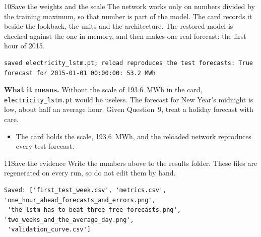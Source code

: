 
\begin{labquestion}{10}{Save the weights and the scale}
The network works only on numbers divided by the training maximum, so that number is part of the model. The card records it beside the lookback, the units and the architecture. The restored model is checked against the one in memory, and then makes one real forecast: the first hour of 2015.
\end{labquestion}
\begin{labanswer}

\begin{refoutput}
\begin{lstlisting}[style=utpterminal]
saved electricity_lstm.pt; reload reproduces the test forecasts: True
forecast for 2015-01-01 00:00:00: 53.2 MWh
\end{lstlisting}
\end{refoutput}

\textbf{What it means.} Without the scale of 193.6~MWh in the card, \texttt{electricity\_lstm.pt} would be useless. The forecast for New Year's midnight is low, about half an average hour. Given Question~9, treat a holiday forecast with care.
\end{labanswer}

\begin{labcheckpoint}
\begin{itemize}[leftmargin=1.2em,itemsep=2pt,topsep=1pt]
  \item The card holds the scale, 193.6~MWh, and the reloaded network reproduces every test forecast.
\end{itemize}
\end{labcheckpoint}


\begin{labquestion}{11}{Save the evidence}
Write the numbers above to the results folder. These files are regenerated on every run, so do not edit them by hand.
\end{labquestion}
\begin{labanswer}

\begin{refoutput}
\begin{lstlisting}[style=utpterminal]
Saved: ['first_test_week.csv', 'metrics.csv', 'one_hour_ahead_forecasts_and_errors.png',
 'the_lstm_has_to_beat_three_free_forecasts.png', 'two_weeks_and_the_average_day.png',
 'validation_curve.csv']
\end{lstlisting}
\end{refoutput}
\end{labanswer}

